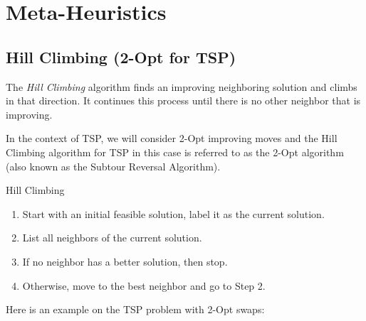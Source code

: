 \section{Meta-Heuristics}

\subsection{Hill Climbing (2-Opt for TSP)}
The \emph{Hill Climbing} algorithm finds an improving neighboring solution and climbs in that direction.  It continues this process until there is no other neighbor that is improving.  

In the context of TSP, we will consider 2-Opt improving moves and the Hill Climbing algorithm for TSP in this case is referred to as the 2-Opt algorithm (also known as the Subtour Reversal Algorithm).
\begin{general}{Hill Climbing}{}
\begin{enumerate}
\item Start with an initial feasible solution, label it as the current solution.
\item List all neighbors of the current solution.
\item If no neighbor has a better solution, then stop.
\item Otherwise, move to the best neighbor and go to Step 2.
\end{enumerate}
\end{general}


Here is an example on the TSP problem with 2-Opt swaps:



